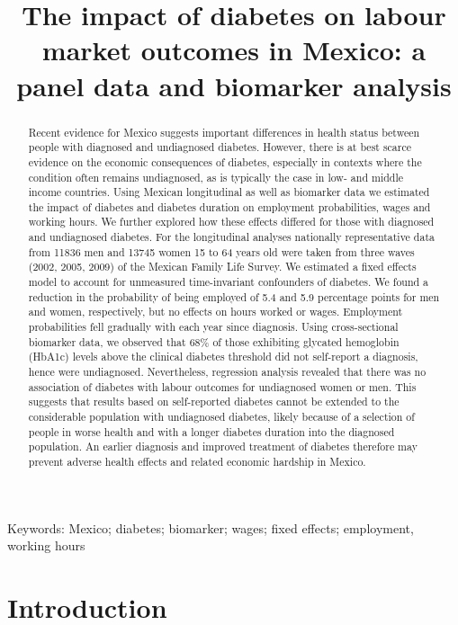\documentclass[12pt,english]{article}
\begin{document}
	\title{The impact of diabetes on labour market outcomes in Mexico: a panel data and biomarker analysis}
	\author{}
	\date{}
 \maketitle 
	\thispagestyle{empty}
	\clearpage
	\begin{abstract}
		Recent evidence for Mexico suggests important differences in health status between people with diagnosed and undiagnosed diabetes. However, there is at best scarce evidence on the economic consequences of diabetes, especially in contexts where the condition often remains undiagnosed, as is typically the case in low- and middle income countries. Using Mexican longitudinal as well as biomarker data we estimated the impact of diabetes and diabetes duration on employment probabilities, wages and working hours. We further explored how these effects differed for those with diagnosed and undiagnosed diabetes. For the longitudinal analyses nationally representative data from 11836 men and 13745 women 15 to 64 years old were taken from three waves (2002, 2005, 2009) of the Mexican Family Life Survey. We estimated a fixed effects model to account for unmeasured time-invariant confounders of diabetes. We found a reduction in the probability of being employed of 5.4 and 5.9 percentage points for men and women, respectively, but no effects on hours worked or wages. Employment probabilities fell gradually with each year since diagnosis. Using cross-sectional biomarker data, we observed that 68\% of those exhibiting glycated hemoglobin (HbA1c) levels above the clinical diabetes threshold did not self-report a diagnosis, hence were undiagnosed. Nevertheless, regression analysis revealed that there was no association of diabetes with labour outcomes for undiagnosed women or men. This suggests that results based on self-reported diabetes cannot be extended to the considerable population with undiagnosed diabetes, likely because of a selection of people in worse health and with a longer diabetes duration into the diagnosed population. An earlier diagnosis and improved treatment of diabetes therefore may prevent adverse health effects and related economic hardship in Mexico.
	\end{abstract}
\noindent Keywords: Mexico; diabetes; biomarker; wages; fixed effects; employment, working hours


\section{\label{sec:Introduction}Introduction }
\end{document}
